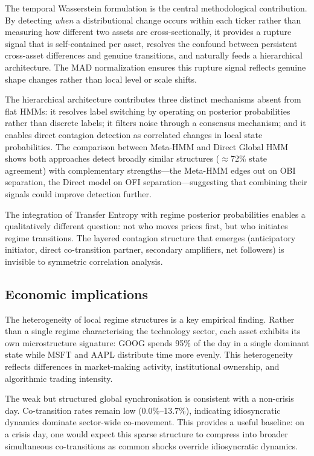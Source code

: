 \documentclass{article}
\begin{document}
The temporal Wasserstein formulation is the central methodological contribution.
By detecting \textit{when} a distributional change occurs within each ticker
rather than measuring how different two assets are cross-sectionally, it
provides a rupture signal that is self-contained per asset, resolves the
confound between persistent cross-asset differences and genuine transitions,
and naturally feeds a hierarchical architecture. The MAD normalization ensures
this rupture signal reflects genuine shape changes rather than local level or
scale shifts.

The hierarchical architecture contributes three distinct mechanisms absent from
flat HMMs: it resolves label switching by operating on posterior probabilities
rather than discrete labels; it filters noise through a consensus mechanism;
and it enables direct contagion detection as correlated changes in local state
probabilities. The comparison between Meta-HMM and Direct Global HMM shows both
approaches detect broadly similar structures ($\approx$72\% state agreement)
with complementary strengths---the Meta-HMM edges out on OBI separation, the
Direct model on OFI separation---suggesting that combining their signals could
improve detection further.

The integration of Transfer Entropy with regime posterior probabilities enables
a qualitatively different question: not who moves prices first, but who
initiates regime transitions. The layered contagion structure that emerges
(anticipatory initiator, direct co-transition partner, secondary amplifiers,
net followers) is invisible to symmetric correlation analysis.

\subsection{Economic implications}

The heterogeneity of local regime structures is a key empirical finding. Rather
than a single regime characterising the technology sector, each asset exhibits
its own microstructure signature: GOOG spends 95\% of the day in a single
dominant state while MSFT and AAPL distribute time more evenly. This
heterogeneity reflects differences in market-making activity, institutional
ownership, and algorithmic trading intensity.

The weak but structured global synchronisation is consistent with a non-crisis
day. Co-transition rates remain low (0.0\%--13.7\%), indicating idiosyncratic
dynamics dominate sector-wide co-movement. This provides a useful baseline: on
a crisis day, one would expect this sparse structure to compress into broader
simultaneous co-transitions as common shocks override idiosyncratic dynamics.
\end{document}
